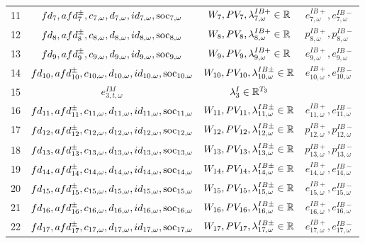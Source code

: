 \begin{table}[H]
\begin{tabular}{c c c c}
	11& $fd_7, afd^{\pm}_7, c_{7, \omega}, d_{7, \omega}, id_{7, \omega}, \text{soc}_{7, \omega}$ & $W_7, PV_7, \lambda^{IB+}_{7, \omega} \in \mathbb{R}$ & $e^{IB+}_{7, \omega}, e^{IB-}_{7, \omega}$\\
	12& $fd_8, afd^{\pm}_8, c_{8, \omega}, d_{8, \omega}, id_{8, \omega}, \text{soc}_{8, \omega}$ & $W_8, PV_8, \lambda^{IB+}_{8, \omega} \in \mathbb{R}$ & $p^{IB+}_{8, \omega}, p^{IB-}_{8, \omega}$ \\
	13& $fd_9, afd^{\pm}_9, c_{9, \omega}, d_{9, \omega}, id_{9, \omega}, \text{soc}_{9, \omega}$ & $W_9, PV_9, \lambda^{IB+}_{9, \omega} \in \mathbb{R}$ & $e^{IB+}_{9, \omega}, e^{IB-}_{9, \omega}$\\
	14& $fd_{10}, afd^{\pm}_{10}, c_{10, \omega}, d_{10, \omega}, id_{10, \omega}, \text{soc}_{10, \omega}$ & $W_{10}, PV_{10}, \lambda^{IB\pm}_{10, \omega} \in \mathbb{R}$ & $e^{IB+}_{10, \omega}, e^{IB-}_{10, \omega}$\\
 15& $e^{IM}_{3, t, \omega}$ & $\lambda^I_3 \in \mathbb{R}^{T_3}$&\\
	16& $fd_{11}, afd^{\pm}_{11}, c_{11, \omega}, d_{11, \omega}, id_{11, \omega}, \text{soc}_{11, \omega}$ & $W_{11}, PV_{11}, \lambda^{IB\pm}_{11, \omega} \in \mathbb{R}$ & $e^{IB+}_{11, \omega}, e^{IB-}_{11, \omega}$\\
	17& $fd_{12}, afd^{\pm}_{12}, c_{12, \omega}, d_{12, \omega}, id_{12, \omega}, \text{soc}_{12, \omega}$ & $W_{12}, PV_{12}, \lambda^{IB\pm}_{12, \omega} \in \mathbb{R}$ & $p^{IB+}_{12, \omega}, p^{IB-}_{12, \omega}$ \\
	18& $fd_{13}, afd^{\pm}_{13}, c_{13, \omega}, d_{13, \omega}, id_{13, \omega}, \text{soc}_{13, \omega}$ & $W_{13}, PV_{13}, \lambda^{IB\pm}_{13, \omega} \in \mathbb{R}$ & $p^{IB+}_{13, \omega}, p^{IB-}_{13, \omega}$ \\
	19& $fd_{14}, afd^{\pm}_{14}, c_{14, \omega}, d_{14, \omega}, id_{14, \omega}, \text{soc}_{14, \omega}$ & $W_{14}, PV_{14}, \lambda^{IB\pm}_{14, \omega} \in \mathbb{R}$ & $e^{IB+}_{14, \omega}, e^{IB-}_{14, \omega}$\\
	20& $fd_{15}, afd^{\pm}_{15}, c_{15, \omega}, d_{15, \omega}, id_{15, \omega}, \text{soc}_{15, \omega}$ & $W_{15}, PV_{15}, \lambda^{IB\pm}_{15, \omega} \in \mathbb{R}$ & $e^{IB+}_{15, \omega}, e^{IB-}_{15, \omega}$\\
	21& $fd_{16}, afd^{\pm}_{16}, c_{16, \omega}, d_{16, \omega}, id_{16, \omega}, \text{soc}_{16, \omega}$ & $W_{16}, PV_{16}, \lambda^{IB\pm}_{16, \omega} \in \mathbb{R}$ & $e^{IB+}_{16, \omega}, e^{IB-}_{16, \omega}$\\
	22& $fd_{17}, afd^{\pm}_{17}, c_{17, \omega}, d_{17, \omega}, id_{17, \omega}, \text{soc}_{17, \omega}$ & $W_{17}, PV_{17}, \lambda^{IB\pm}_{17, \omega} \in \mathbb{R}$ & $e^{IB+}_{17, \omega}, e^{IB-}_{17, \omega}$\\

\end{tabular}
\end{table}
